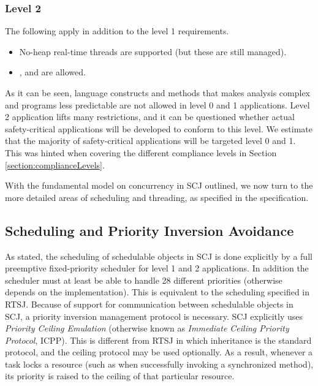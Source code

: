 \subsubsection{Level 2}
The following apply in addition to the level 1 requirements.
\begin{itemize}
	\item No-heap real-time threads are supported (but these are still managed).
	\item {},  and  are allowed.
\end{itemize}

As it can be seen, language constructs and methods that makes analysis complex and programs less predictable are not allowed in level 0 and 1 applications. Level 2 application lifts many restrictions, and it can be questioned whether actual safety-critical applications will be developed to conform to this level. We estimate that the majority of safety-critical applications will be targeted level 0 and 1. This was hinted when covering the different compliance levels in Section \ref{section:complianceLevels}.

With the fundamental model on concurrency in SCJ outlined, we now turn to the more detailed areas of scheduling and threading, as specified in the specification.

\subsection{Scheduling and Priority Inversion Avoidance} %
\label{sub:schedulingobjects}
As stated, the scheduling of schedulable objects in SCJ is done explicitly by a full preemptive fixed-priority scheduler for level 1 and 2 applications. In addition the scheduler must at least be able to handle 28 different priorities (otherwise depends on the implementation). This is equivalent to the scheduling specified in RTSJ. Because of support for communication between schedulable objects in SCJ, a priority inversion management protocol is necessary. SCJ explicitly uses \textit{Priority Ceiling Emulation} (otherwise known as \textit{Immediate Ceiling Priority Protocol}, ICPP). This is different from RTSJ in which inheritance is the standard protocol, and the ceiling protocol may be used optionally. As a result, whenever a task locks a resource (such as when successfully invoking a synchronized method), its priority is raised to the ceiling of that particular resource.

